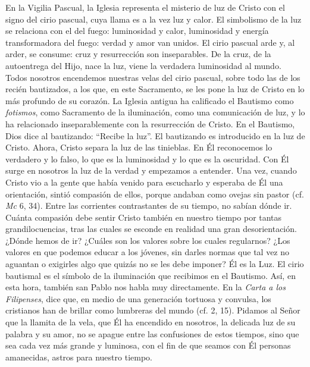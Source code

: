 			\begin{body}En la Vigilia Pascual, la Iglesia representa el misterio de luz de Cristo con el signo del cirio pascual, cuya llama es a la vez luz y calor. El simbolismo de la luz se relaciona con el del fuego: luminosidad y calor, luminosidad y energía transformadora del fuego: verdad y amor van unidos. El cirio pascual arde y, al arder, se consume: cruz y resurrección son inseparables. De la cruz, de la autoentrega del Hijo, nace la luz, viene la verdadera luminosidad al mundo. Todos nosotros encendemos nuestras velas del cirio pascual, sobre todo las de los recién bautizados, a los que, en este Sacramento, se les pone la luz de Cristo en lo más profundo de su corazón. La Iglesia antigua ha calificado el Bautismo como \textit{fotismos}, como Sacramento de la iluminación, como una comunicación de luz, y lo ha relacionado inseparablemente con la resurrección de Cristo. En el Bautismo, Dios dice al bautizando: “Recibe la luz”. El bautizando es introducido en la luz de Cristo. Ahora, Cristo separa la luz de las tinieblas. En Él reconocemos lo verdadero y lo falso, lo que es la luminosidad y lo que es la oscuridad. Con Él surge en nosotros la luz de la verdad y empezamos a entender. Una vez, cuando Cristo vio a la gente que había venido para escucharlo y esperaba de Él una orientación, sintió compasión de ellos, porque andaban como ovejas sin pastor (cf. \textit{Mc} 6, 34). Entre las corrientes contrastantes de su tiempo, no sabían dónde ir. Cuánta compasión debe sentir Cristo también en nuestro tiempo por tantas grandilocuencias, tras las cuales se esconde en realidad una gran desorientación. ¿Dónde hemos de ir? ¿Cuáles son los valores sobre los cuales regularnos? ¿Los valores en que podemos educar a los jóvenes, sin darles normas que tal vez no aguantan o exigirles algo que quizás no se les debe imponer? Él es la Luz. El cirio bautismal es el símbolo de la iluminación que recibimos en el Bautismo. Así, en esta hora, también san Pablo nos habla muy directamente. En la \textit{Carta a los Filipenses}, dice que, en medio de una generación tortuosa y convulsa, los cristianos han de brillar como lumbreras del mundo (cf. 2, 15). Pidamos al Señor que la llamita de la vela, que Él ha encendido en nosotros, la delicada luz de su palabra y su amor, no se apague entre las confusiones de estos tiempos, sino que sea cada vez más grande y luminosa, con el fin de que seamos con Él personas amanecidas, astros para nuestro tiempo.\end{body}
			
